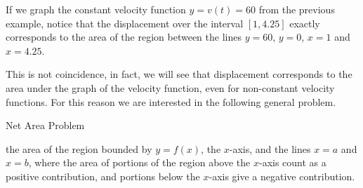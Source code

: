 \documentclass{ximera}
\begin{document}
If we graph the constant velocity function $y=v(t)=60$ from the previous example, notice that the displacement over the interval $[1,4.25]$ exactly corresponds to the area of the region between the lines $y=60$, $y=0$, $x=1$ and $x=4.25$.

\begin{image}
  \end{image}

This is not coincidence, in fact, we will see that displacement corresponds to the area under the graph of the velocity function, even for non-constant velocity functions. For this reason we are interested in the following general problem.

\begin{problem}{Net Area Problem}
\begin{foldable}
 the area of the region bounded by $y=f(x)$, the $x$-axis, and the lines $x=a$ and $x=b$, where the area of portions of the region above the $x$-axis count as a positive contribution, and portions below the $x$-axis give a negative contribution.
\end{foldable}
\end{problem}
\end{document}
